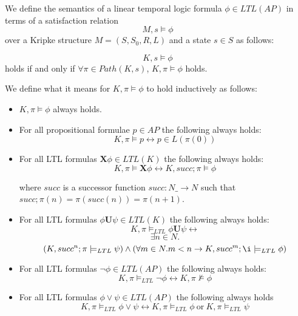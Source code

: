\begin{mydef}
We define the semantics of a linear temporal logic formula $\phi \in LTL(AP)$ in terms of a satisfaction relation $$M,s \models \phi$$ over a Kripke structure $M = (S, S_0,R,L)$ and a state $s \in S$ as follows:

$$K,s \models \phi$$ holds if and only if $\forall \pi \in Path(K, s)$, $K,\pi \models \phi$ holds.

We define what it means for $K, \pi \models \phi$ to hold inductively as follows:

\begin{itemize} 
\item $K,\pi \models \phi$ always holds.

\item For all propositional formulae $p \in AP$ the following always holds:
     $$K,\pi \models p \leftrightarrow p \in L(\pi(0))$$

\item For all LTL formulas $\mathbf{X} \phi \in LTL(K)$ the following always holds:
$$ K, \pi \models \mathbf{X} \phi \leftrightarrow K, succ;\pi \models \phi $$

where $succ$ is a successor function $succ: N \_ \to N$ such that $succ;\pi(n) = \pi(succ(n)) = \pi(n + 1)$.

\item For all LTL formulas $\phi \mathbf{U} \psi \in LTL(K)$ the following always holds:
$$K, \pi \models_{LTL} \phi \mathbf{U} \psi \leftrightarrow$$
$$\exists n \in N.$$
$$(K,succ^n; \pi \models_{LTL} \psi) \wedge (\forall m \in N. m < n \to K, succ^m;\i \models_{LTL} \phi)$$

\item For all LTL formulas $\neg \phi \in LTL(AP)$ the following always holds:
$$K,\pi \models_{LTL} \neg \phi \leftrightarrow K,\pi \not\models \phi $$

\item For all LTL formulas $\phi \vee \psi \in LTL(AP)$ the following always holds
$$K,\pi \models_{LTL} \phi \vee \psi \leftrightarrow K,\pi \models_{LTL} \phi \ \mathrm{or} \ K,\pi \models_{LTL} \psi $$

\end{itemize}




\end{mydef}
